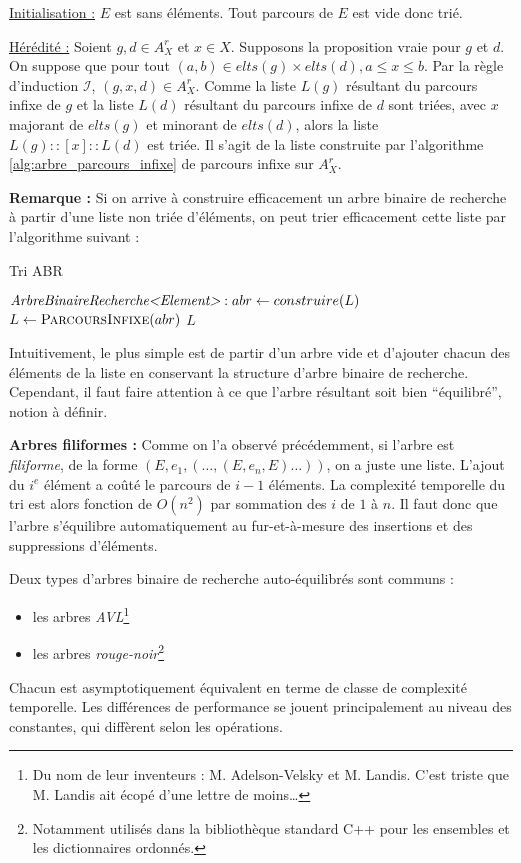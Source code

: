 \documentclass[../../../main.tex]{subfiles}
\begin{document}
\underline{Initialisation :} $E$ est sans éléments. Tout parcours de $E$ est vide donc trié.

\underline{Hérédité :} Soient $g, d\in A^r_X$ et $x\in X$. Supposons la proposition vraie pour $g$ et $d$. On suppose que pour tout $(a, b)\in elts(g)\times elts(d), a \leq x\leq b$. Par la règle d'induction $\mathcal{I}$, $(g, x, d)\in A^r_X$. Comme la liste $L(g)$ résultant du parcours infixe de $g$ et la liste $L(d)$ résultant du parcours infixe de $d$ sont triées, avec $x$ majorant de $elts(g)$ et minorant de $elts(d)$, alors la liste $L(g)::[x]::L(d)$ est triée. Il s'agit de la liste construite par l'algorithme \ref{alg:arbre_parcours_infixe} de parcours infixe sur $A^r_X$.

\textbf{Remarque :} Si on arrive à construire efficacement un arbre binaire de recherche à partir d'une liste non triée d'éléments, on peut trier efficacement cette liste par l'algorithme suivant :

\begin{algorithm}
\caption{Tri ABR\label{alg:arbre_tri_infixe}}
$\textit{ArbreBinaireRecherche\textless{}Element\textgreater}:abr \leftarrow construire(L)$\;
$L\leftarrow \textsc{ParcoursInfixe}(abr)$\;
\Return $L$\;
\end{algorithm}

Intuitivement, le plus simple est de partir d'un arbre vide et d'ajouter chacun des éléments de la liste en conservant la structure d'arbre binaire de recherche. Cependant, il faut faire attention à ce que l'arbre résultant soit bien ``équilibré'', notion à définir. 

\textbf{Arbres filiformes :} Comme on l'a observé précédemment, si l'arbre est \textit{filiforme}, de la forme $(E, e_1, (\dots, (E, e_n, E)\dots))$, on a juste une liste. L'ajout du $i^e$ élément a coûté le parcours de $i-1$ éléments. La complexité temporelle du tri est alors fonction de $O(n^2)$ par sommation des $i$ de $1$ à $n$. Il faut donc que l'arbre s'équilibre automatiquement au fur-et-à-mesure des insertions et des suppressions d'éléments.

Deux types d'arbres binaire de recherche auto-équilibrés sont communs :
\begin{itemize}
	\item les arbres \textit{AVL}\footnote{Du nom de leur inventeurs : M. Adelson-Velsky et M. Landis. C'est triste que M. Landis ait écopé d'une lettre de moins\dots}
	\item les arbres \textit{rouge-noir}\footnote{Notamment utilisés dans la bibliothèque standard C++ pour les ensembles et les dictionnaires ordonnés.}
\end{itemize}
Chacun est asymptotiquement équivalent en terme de classe de complexité temporelle. Les différences de performance se jouent principalement au niveau des constantes, qui diffèrent selon les opérations.
\end{document}
